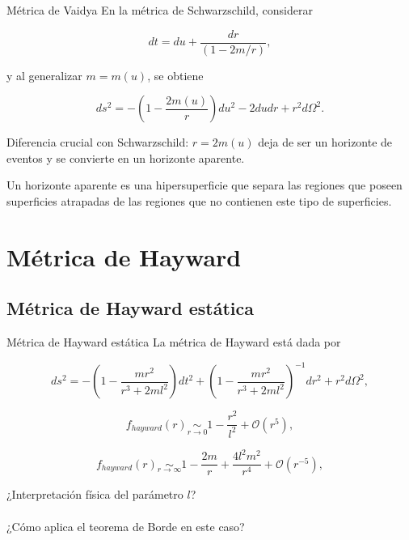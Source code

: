\documentclass[t]{beamer}
\numberwithin{equation}{section}
\begin{document}
\begin{frame}{Métrica de Vaidya}
En la métrica de Schwarzschild, considerar

\begin{equation}
dt = du + \frac{dr}{(1 - 2m/r)},
\end{equation}

y al generalizar $m = m(u)$, se obtiene

\begin{equation}
\label{schw-tortoise}
ds^2 = - \left(1- \frac{2m(u)}{r}\right)du^2 - 2dudr + r^2d\Omega^2.
\end{equation}

%
%

Diferencia crucial con Schwarzschild: $r = 2m(u)$ deja de ser un horizonte de eventos y se convierte en un horizonte aparente.

\begin{definition}
Un horizonte aparente es una hipersuperficie que separa las regiones que poseen superficies atrapadas de las regiones que no contienen este tipo de superficies.
\end{definition}

\end{frame}


\section{\label{planck stars section} Métrica de Hayward}


\subsection{Métrica de Hayward estática}

\begin{frame}{Métrica de Hayward estática}
La métrica de Hayward está dada por

\begin{equation}
\label{hayward metric}
ds^2 = -\left( 1 - \frac{mr^2}{r^3 + 2ml^2} \right) dt^2 + \left( 1 - \frac{mr^2}{r^3 + 2ml^2} \right)^{-1} dr^2 + r^2d\Omega ^2,
\end{equation}

\begin{equation}
f_{hayward}(r) \underset{r \to 0}{\sim} 1 - \frac{r^2}{l^2} + \mathcal{O}(r^5),
\end{equation}

\begin{equation}
f_{hayward}(r) \underset{r \to \infty}{\sim} 1 - \frac{2m}{r} + \frac{4l^2m^2}{r^4} + \mathcal{O}(r^{-5}),
\end{equation}

¿Interpretación física del parámetro $l$?
\
\\
\
\\
¿Cómo aplica el teorema de Borde en este caso?
\end{frame}
\end{document}
